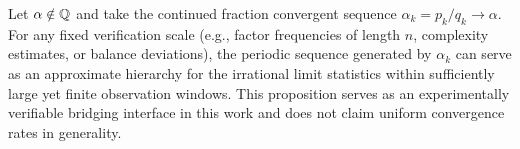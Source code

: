 \begin{proposition}\label{prop:finite-sample-approx-hierarchy}
Let $\alpha\notin\mathbb{Q}$ and take the continued fraction convergent sequence $\alpha_k=p_k/q_k\to\alpha$. For any fixed verification scale (e.g., factor frequencies of length $n$, complexity estimates, or balance deviations), the periodic sequence generated by $\alpha_k$ can serve as an approximate hierarchy for the irrational limit statistics within sufficiently large yet finite observation windows. This proposition serves as an experimentally verifiable bridging interface in this work and does not claim uniform convergence rates in generality.
\end{proposition}

